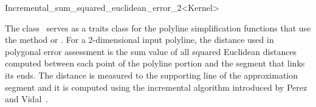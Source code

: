 
\begin{ccRefClass}{Incremental_sum_squared_euclidean_error_2<Kernel>}

\ccDefinition
  
The class \ccRefName\ serves as a traits class for the polyline
simplification functions that use the method  or
.  For a 2-dimensional input polyline, the
distance used in polygonal error assessment is the sum value of all
squared Euclidean distances computed between each point of the polyline
portion and the segment that links its ends. The distance is measured
to the supporting line of the approximation segment and it is computed
using the incremental algorithm introduced by Perez and Vidal~\cite{cgal:pv-opadc-94}.


\ccIsModel



\ccTypes



\ccSeeAlso


\end{ccRefClass}

